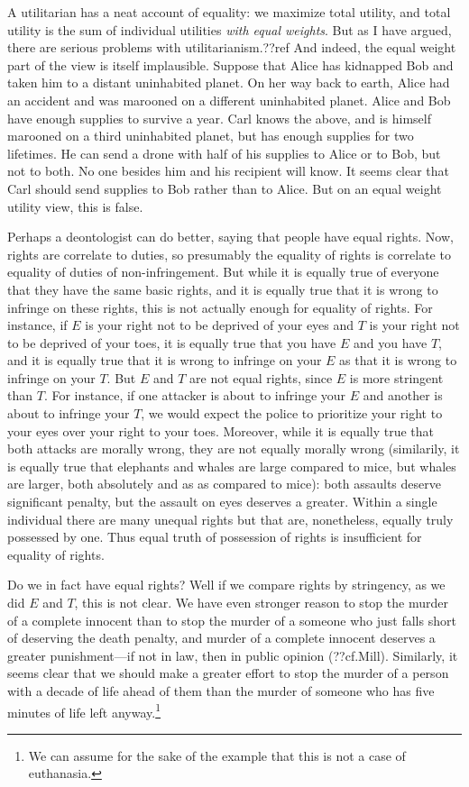 A utilitarian has a neat account of equality: we maximize total utility, and total utility is the sum of
individual utilities \textit{with equal weights}. But as I have argued, there are serious problems with
utilitarianism.??ref And indeed, the equal weight part of the view is itself implausible. Suppose that 
Alice has kidnapped Bob and taken him to a distant uninhabited planet. On her way back to earth, Alice 
had an accident and was marooned on a different uninhabited planet. Alice and Bob have enough supplies to
survive a year. Carl knows the above, and is himself marooned on a third uninhabited planet, but has enough 
supplies for two lifetimes. He can send a drone with half of his supplies to Alice or to Bob, but not to
both. No one besides him and his recipient will know. It seems clear that Carl should send supplies to
Bob rather than to Alice. But on an equal weight utility view, this is false.

Perhaps a deontologist can do better, saying that people have equal rights. Now, rights are correlate to duties, so presumably the
equality of rights is correlate to equality of duties of non-infringement. But while it is 
equally true of everyone that they have the same basic rights, and it is equally true that it is
wrong to infringe on these rights, this is not actually enough for equality of rights. For instance, 
if $E$ is your right not to be deprived of your eyes and $T$ is your right not to be deprived of your toes, 
it is equally true that you have $E$ and you have $T$, and it is equally true that it is wrong to 
infringe on your $E$ as that it is wrong to infringe on your $T$. But $E$ and $T$ are not equal rights, since
$E$ is more stringent than $T$. For instance, if one attacker is about to infringe your $E$ and another is about
to infringe your $T$, we would expect the police to prioritize your right to your eyes over your right to your
toes. Moreover, while it is equally true that both attacks are morally wrong, they are not equally morally wrong 
(similarily, it is equally true that elephants and whales are large compared to mice, but whales are larger, both
absolutely and as as compared to mice): both assaults deserve significant penalty, but the assault on eyes deserves
a greater. Within a single individual there are many unequal rights but that are, nonetheless, equally truly possessed
by one. Thus equal truth of possession of rights is insufficient for equality of rights.

Do we in fact have equal rights? Well if we compare rights by stringency, as we did $E$ and $T$, this is not clear.
We have even stronger reason to stop the murder of a complete innocent than to stop the murder of a someone who just falls
short of deserving the death penalty, and murder of a complete innocent deserves a greater punishment---if not in law, then
in public opinion (??cf.Mill). Similarly, it seems clear that we should make a greater effort to stop the murder of a person
with a decade of life ahead of them than the murder of someone who has five minutes of life left anyway.\footnote{We can assume
for the sake of the example that this is not a case of euthanasia.} 

